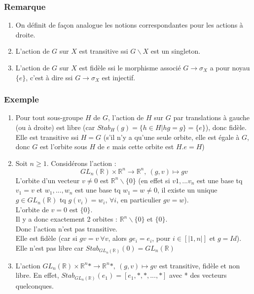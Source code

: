 \documentclass[a4paper, oneside]{report}
\newcommand{\x}{\times}
\newcommand{\R}{\mathbb{R}}
\newcommand{\remar}{\subsubsection{Remarque}}
\newcommand{\exem}{\subsubsection{Exemple}}
\begin{document}
\remar
\begin{enumerate}
\item On définit de façon analogue les notions correspondantes pour les actions à droite.
\item L'action de $G$ sur $X$ est transitive ssi $G\backslash X$ est un singleton.
\item L'action de $G$ sur $X$ est fidèle ssi le morphisme associé $G\rightarrow \sigma_X$ a pour noyau $\{e\}$, c'est à dire ssi $G\rightarrow \sigma_X$ est injectif.
\end{enumerate}

\exem
\begin{enumerate}
\item Pour tout sous-groupe $H$ de $G$, l'action de $H$ sur $G$ par translations à gauche (ou à droite) est libre (car $Stab_H(g)=\{h\in H |hg=g \}=\{e\}$), donc fidèle.\\
Elle est transitive ssi $H=G$ (s'il n'y a qu'une seule orbite, elle est égale à $G$, donc $G$ est l'orbite sous $H$ de $e$ mais cette orbite est $H.e=H$)
\item Soit $n\geq 1$. Considérons l'action :
$$GL_n(\R)\x \R^n \rightarrow \R^n,~(g,v)\mapsto gv $$
L'orbite d'un vecteur $v\neq 0$ est $\R^n\backslash \{0\}$ (en effet si $v1,...v_n$ est une base tq $v_1 = v$ et $w_1,...,w_n$ est une base tq $w_1=w\neq 0$, il existe un unique $g\in GL_n(\R)$ tq $g(v_i)=w_i$, $\forall i$, en particulier $gv=w$).\\
L'orbite de $v=0$ est $\{0\}$.\\
Il y a donc exactement 2 orbites : $\R^n\backslash \{0\}$ et $\{0\}$.\\
Donc l'action n'est pas transitive.\\
Elle est fidèle (car si $gv=v~\forall v$, alors $ge_i=e_i$, pour $i\in [|1,n|]$ et $g=Id$).\\
Elle n'est pas libre car $Stab_{GL_n(\R)}(0)=GL_n(\R)$

\item L'action $GL_n(\R)\x \R^n* \rightarrow \R^n*,~(g,v)\mapsto gv $ est transitive, fidèle et non libre. En effet, $Stab_{GL_n(\R)}(e_1)=[e_1,*,*,...,*]$ avec * des vecteurs quelconques.


\end{enumerate}
\end{document}
